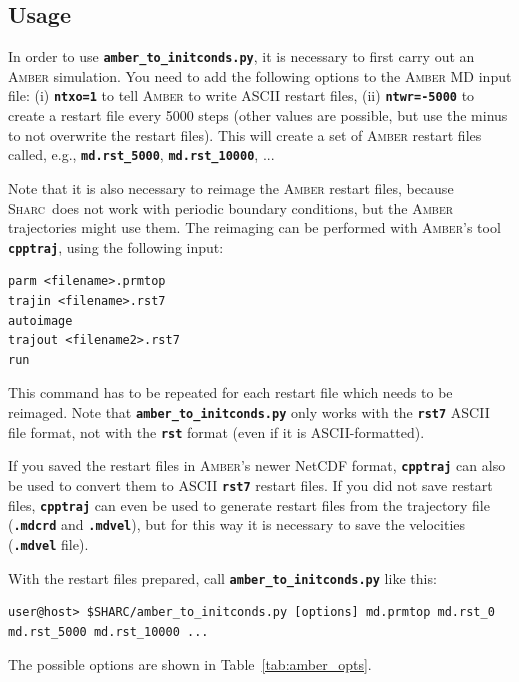 \documentclass[a4paper,10pt,DIV=15,openany]{scrbook}
\newcommand{\sharc}{\textsc{Sharc}}
\newcommand{\ttt}[1]{\textbf{\texttt{#1}}}
\begin{document}
\subsection{Usage}

In order to use \ttt{amber\_to\_initconds.py}, it is necessary to first carry out an \textsc{Amber} simulation.
You need to add the following options to the \textsc{Amber} MD input file: (i) \ttt{ntxo=1} to tell \textsc{Amber} to write ASCII restart files, (ii) \ttt{ntwr=-5000} to create a restart file every 5000 steps (other values are possible, but use the minus to not overwrite the restart files).
This will create a set of \textsc{Amber} restart files called, e.g., \ttt{md.rst\_5000}, \ttt{md.rst\_10000}, ...

Note that it is also necessary to reimage the \textsc{Amber} restart files, because \sharc\ does not work with periodic boundary conditions, but the \textsc{Amber} trajectories might use them.
The reimaging can be performed with \textsc{Amber}'s tool \ttt{cpptraj}, using the following input:
\begin{verbatim}
parm <filename>.prmtop
trajin <filename>.rst7
autoimage
trajout <filename2>.rst7
run
\end{verbatim}
This command has to be repeated for each restart file which needs to be reimaged.
Note that \ttt{amber\_to\_initconds.py} only works with the \ttt{rst7} ASCII file format, not with the \ttt{rst} format (even if it is ASCII-formatted).

If you saved the restart files in \textsc{Amber}'s newer NetCDF format, \ttt{cpptraj} can also be used to convert them to ASCII \ttt{rst7} restart files.
If you did not save restart files, \ttt{cpptraj} can even be used to generate restart files from the trajectory file (\ttt{.mdcrd} and \ttt{.mdvel}), but for this way it is necessary to save the velocities (\ttt{.mdvel} file).

With the restart files prepared, call \ttt{amber\_to\_initconds.py} like this:
\begin{verbatim}
user@host> $SHARC/amber_to_initconds.py [options] md.prmtop md.rst_0 md.rst_5000 md.rst_10000 ...
\end{verbatim}
The possible options are shown in Table~\ref{tab:amber_opts}.
\end{document}
